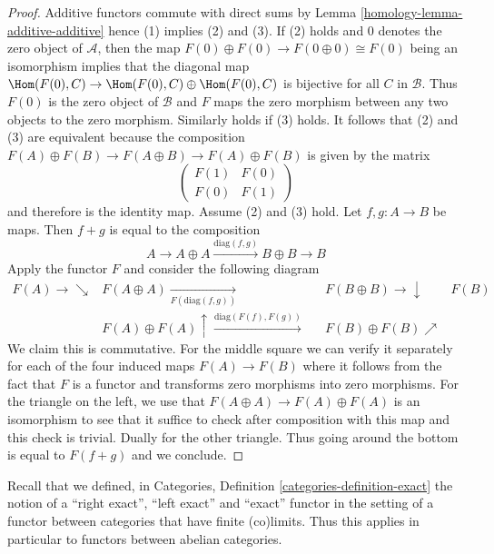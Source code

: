\begin{proof}

Additive functors commute with direct sums by
Lemma \ref{homology-lemma-additive-additive} hence (1)
implies (2) and (3). If (2) holds and $0$ denotes the
zero object of $\mathcal{A}$, then the map
$F(0) \oplus F(0) \to F(0 \oplus 0) \cong F(0)$
being an isomorphism implies that the diagonal map
$\Hom(F(0), C) \to \Hom(F(0), C) \oplus \Hom(F(0), C)$
is bijective for all $C$ in $\mathcal{B}$. Thus $F(0)$
is the zero object of $\mathcal{B}$ and $F$ maps the
zero morphism between any two objects to the zero morphism.
Similarly holds if (3) holds. It follows that (2) and (3)
are equivalent because the composition
$F(A) \oplus F(B) \to F(A \oplus B) \to F(A) \oplus F(B)$
is given by the matrix
$$
\left(
\begin{matrix}
F(1) & F(0) \\
F(0) & F(1)
\end{matrix}
\right)
$$
and therefore is the identity map. Assume (2) and (3) hold.
Let $f, g : A \to B$ be maps. Then $f + g$ is equal to
the composition
$$
A \to A \oplus A \xrightarrow{\text{diag}(f, g)} B \oplus B \to B
$$
Apply the functor $F$ and consider the following diagram
$$
\begin{array}{ccccc}F(A) \longrightarrow\searrow & F(A \oplus A) \underset{F(\text{diag}(f, g))}{\longrightarrow} &  & F(B \oplus B) \longrightarrow\downarrow & F(B) \\  & F(A) \oplus F(A) \uparrow\overset{\text{diag}(F(f), F(g))}{\longrightarrow} &  & F(B) \oplus F(B) \nearrow & \end{array}
$$
We claim this is commutative. For the middle square we can verify it
separately for each of the four induced maps $F(A) \to F(B)$
where it follows from the fact that $F$ is a functor and
transforms zero morphisms into zero morphisms.
For the triangle on the left, we use that
$F(A \oplus A) \to F(A) \oplus F(A)$ is an isomorphism
to see that it suffice to check after composition with
this map and this check is trivial. Dually for the other triangle.
Thus going around the bottom is equal to $F(f + g)$ and we conclude.
\end{proof}

Recall that we defined, in
Categories, Definition \ref{categories-definition-exact}
the notion of a ``right exact'', ``left exact'' and
``exact'' functor in the setting of a functor between
categories that have finite (co)limits. Thus this
applies in particular to functors between abelian
categories.

